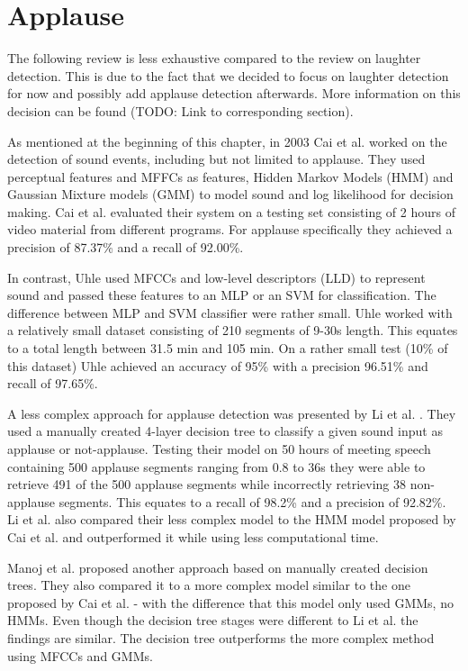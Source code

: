 \documentclass[bsc,frontabs,parskip,deptreport]{infthesis}
\begin{document}
\section{Applause}
The following review is less exhaustive compared to the review on laughter detection.
This is due to the fact that we decided to focus on laughter detection for now and possibly add applause detection afterwards.
More information on this decision can be found (TODO: Link to corresponding section).

As mentioned at the beginning of this chapter, in 2003 Cai et al. \citep{cai2003highlight} worked on the detection of sound events, including but not limited to applause.
They used perceptual features and MFFCs as features, Hidden Markov Models (HMM) and Gaussian Mixture models (GMM) to model sound and log likelihood for decision making.
Cai et al. evaluated their system on a testing set consisting of 2 hours of video material from different programs.
For applause specifically they achieved a precision of 87.37\% and a recall of 92.00\%.

In contrast, Uhle \citep{uhle2011applause} used MFCCs and low-level descriptors (LLD) to represent sound and passed these features to an MLP or an SVM for classification.
The difference between MLP and SVM classifier were rather small.
Uhle worked with a relatively small dataset consisting of 210 segments of 9-30s length. This equates to a total length between 31.5 min and 105 min.
On a rather small test (10\% of this dataset) Uhle achieved an accuracy of 95\% with a precision 96.51\% and recall of 97.65\%.

A less complex approach for applause detection was presented by Li et al. \citep{li2009characteristics}.
They used a manually created 4-layer decision tree to classify a given sound input as applause or not-applause.
Testing their model on 50 hours of meeting speech containing 500 applause segments ranging from 0.8 to 36s they were able to retrieve 491 of the 500 applause segments while incorrectly retrieving 38 non-applause segments.
This equates to a recall of 98.2\% and a precision of 92.82\%. Li et al. also compared their less complex model to the HMM model proposed by Cai et al.\citep{cai2003highlight} and outperformed it while using less computational time.

Manoj et al. \citep{manoj2011novel} proposed another approach based on manually created decision trees. They also compared it to a more complex model similar to the one proposed by Cai et al. \citep{cai2003highlight} - with the difference that this model only used GMMs, no HMMs.
Even though the decision tree stages were different to Li et al. \citep{li2009characteristics} the findings are similar. The decision tree outperforms the more complex method using MFCCs and GMMs.  
\end{document}
